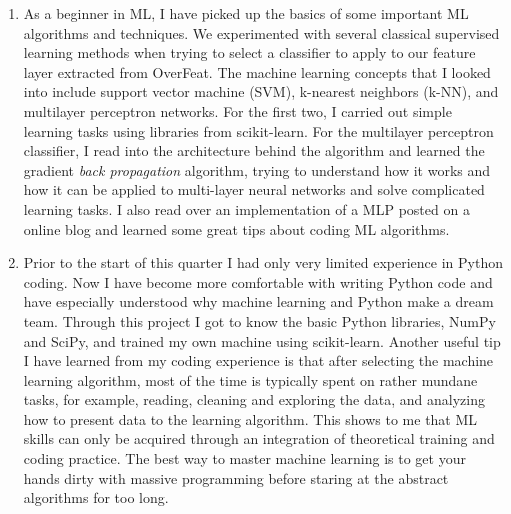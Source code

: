 \documentclass[11pt, oneside]{article}   	%
\begin{document}
\begin{enumerate}
\item As a beginner in ML, I have picked up the basics of some important ML algorithms and techniques. We experimented with several classical supervised learning methods when trying to select a classifier to apply to our feature layer extracted from OverFeat. The machine learning concepts that I looked into include support vector machine (SVM), k-nearest neighbors (k-NN), and multilayer perceptron networks. For the first two, I carried out simple learning tasks using libraries from scikit-learn. For the multilayer perceptron classifier, I read into the architecture behind the algorithm and learned the gradient \emph{back propagation} algorithm, trying to understand how it works and how it can be applied to multi-layer neural networks and solve complicated learning tasks. I also read over an implementation of a MLP posted on a online blog and learned some great tips about coding ML algorithms. 

\item Prior to the start of this quarter I had only very limited experience in Python coding. Now I have become more comfortable with writing Python code and have especially understood why machine learning and Python make a dream team. Through this project I got to know the basic Python libraries, NumPy and SciPy, and trained my own machine using scikit-learn. Another useful tip I have learned from my coding experience is that after selecting the machine learning algorithm, most of the time is typically spent on rather mundane tasks, for example, reading, cleaning and exploring the data, and analyzing how to present data to the learning algorithm. This shows to me that ML skills can only be acquired through an integration of theoretical training and coding practice. The best way to master machine learning is to get your hands dirty with massive programming before staring at the abstract algorithms for too long.
\end{enumerate}
\end{document}
